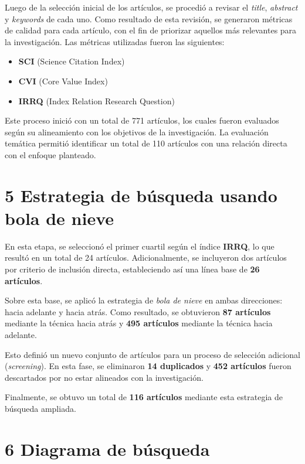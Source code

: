 Luego de la selección inicial de los artículos, se procedió a revisar el \textit{title}, \textit{abstract} y \textit{keywords} de cada uno. Como resultado de esta revisión, se generaron métricas de calidad para cada artículo, con el fin de priorizar aquellos más relevantes para la investigación. Las métricas utilizadas fueron las siguientes:

\begin{itemize}
    \item \textbf{SCI} (Science Citation Index)
    \item \textbf{CVI} (Core Value Index)
    \item \textbf{IRRQ} (Index Relation Research Question)
\end{itemize}

Este proceso inició con un total de 771 artículos, los cuales fueron evaluados según su alineamiento con los objetivos de la investigación. La evaluación temática permitió identificar un total de 110 artículos con una relación directa con el enfoque planteado.

\section*{5 Estrategia de búsqueda usando bola de nieve}
\label{sec:bolaDeNieve}

En esta etapa, se seleccionó el primer cuartil según el índice \textbf{IRRQ}, lo que resultó en un total de 24 artículos. Adicionalmente, se incluyeron dos artículos por criterio de inclusión directa, estableciendo así una línea base de \textbf{26 artículos}. 

Sobre esta base, se aplicó la estrategia de \textit{bola de nieve} en ambas direcciones: hacia adelante y hacia atrás. Como resultado, se obtuvieron \textbf{87 artículos} mediante la técnica hacia atrás y \textbf{495 artículos} mediante la técnica hacia adelante. 

Esto definió un nuevo conjunto de artículos para un proceso de selección adicional (\textit{screening}). En esta fase, se eliminaron \textbf{14 duplicados} y \textbf{452 artículos} fueron descartados por no estar alineados con la investigación. 

Finalmente, se obtuvo un total de \textbf{116 artículos} mediante esta estrategia de búsqueda ampliada.

\section*{6 Diagrama de búsqueda}
\label{sec:diagramaBusqueda}

